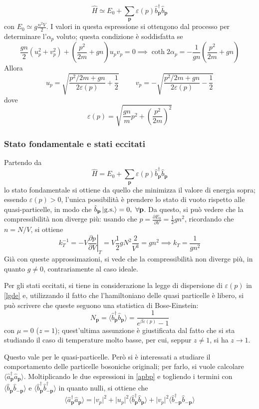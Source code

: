 \documentclass[11pt, a4paper]{scrartcl}
\theoremstyle{style}
\theoremstyle{style1}
\newcommand*\Eval[3]{\left.#1\right\rvert_{#2}^{#3}}
\numberwithin{equation}{subsection}
\begin{document}
\[
\hat{H} \simeq E_0 + \sum_{\mathbf{p} }^{} \varepsilon (p ) \hat{b}^\dagger _\mathbf{p} \hat{b}_\mathbf{p} 
\] 
con $E_0 \simeq g \frac{n^2V}{2}$. I valori in questa espressione si ottengono dal processo per determinare l'$\alpha _p$ voluto; questa condizione \`e soddisfatta se 
\[
\frac{gn}{2}\left(u_p ^2 + v_p ^2\right) + \left(\frac{p^2}{2m}+ gn\right) u_p v_p = 0 \implies \coth 2\alpha _p = -\frac{1}{gn}\left(\frac{p^2}{2m}+gn\right) 
\] 
Allora
\[
u_p = \sqrt{\frac{p^2 / 2m + gn}{2\varepsilon (p)} +\frac{1}{2}} \hspace{1cm}v_p = -\sqrt{\frac{p^2 / 2m + gn}{2 \varepsilon (p)}-\frac{1}{2}} 
\] 
dove
\begin{equation}\label{lgde}
\varepsilon (p) = \sqrt{\frac{gn}{m}p^2 + \left(\frac{p^2}{2m}\right) ^2} 
\end{equation}
\subsubsection{Stato fondamentale e stati eccitati}
Partendo da 
\[
\hat{H} = E_0 + \sum_{\mathbf{p}}^{} \varepsilon (p) \hat{b}^\dagger _\mathbf{p} \hat{b}_\mathbf{p} 
\] 
lo stato fondamentale si ottiene da quello che minimizza il valore di energia sopra; essendo $\varepsilon (p) > 0$, l'unica possibilit\`a \`e prendere lo stato di vuoto rispetto alle quasi-particelle, in modo che $\hat{b}_\mathbf{p} \ket{\text{g.s.}} = 0 , \ \forall \mathbf{p} $.
Da questo, si pu\`o vedere che la compressibilit\`a non diverge pi\`u: usando che $p = \frac{\partial E_0}{\partial V} =\frac{1}{2}gn^2$, ricordando che $n = N / V$, si ottiene
\[
	k_T^{-1} = \Eval{-V \frac{\partial p}{\partial V} }{T}{} = V \frac{1}{2}g N^2 \frac{2}{V^3} = gn^2 \implies k_T = \frac{1}{gn^2}
\] 
Gi\`a con queste approssimazioni, si vede che la compressibilit\`a non diverge pi\`u, in quanto $g\neq 0$, contrariamente al caso ideale.

Per gli stati eccitati, si tiene in considerazione la legge di dispersione di $\varepsilon (p)$ in \ref{lgde} e, utilizzando il fatto che l'hamiltoniano delle quasi particelle \`e libero, si pu\`o scrivere che queste seguono una statistica di Bose-Einstein:
\[
N_\mathbf{p}  = \langle \hat{b}^\dagger _\mathbf{p} \hat{b}_\mathbf{p}  \rangle= \frac{1}{e^{\beta \varepsilon (p)}-1}
\] 
con $\mu =0$ ($z=1$); quest'ultima assunzione \`e giustificata dal fatto che si sta studiando il caso di temperature molto basse, per cui, seppur $z\neq 1$, si ha $z\to 1$.

Questo vale per le quasi-particelle. Per\`o si \`e interessati a studiare il comportamento delle particelle bosoniche originali; per farlo, si vuole calcolare $\langle \hat{a}^\dagger _\mathbf{p} \hat{a}_\mathbf{p}  \rangle$.
Moltiplicando le due espressioni in \ref{apbp} e togliendo i termini con $\langle \hat{b}_\mathbf{p} \hat{b}_{-\mathbf{p} }  \rangle$ e $\langle \hat{b}_\mathbf{p}^\dagger  \hat{b}^\dagger _{-\mathbf{p} }  \rangle$ in quanto nulli, si ottiene che
\[
\langle \hat{a}^\dagger _\mathbf{p} \hat{a}_\mathbf{p}  \rangle= \lvert v_p \rvert ^2 + \lvert u_p \rvert ^2 \langle \hat{b}^\dagger _\mathbf{p} \hat{b}_\mathbf{p}  \rangle + \lvert v_p \rvert ^2 \langle \hat{b}^\dagger _{-\mathbf{p} } \hat{b}_{-\mathbf{p} }  \rangle
\] 
\end{document}
